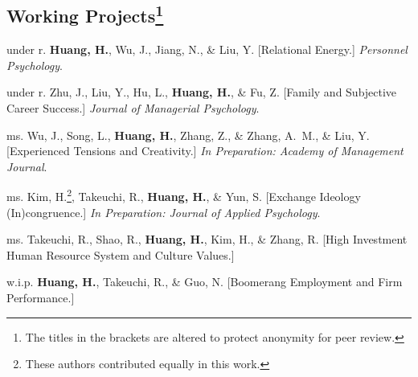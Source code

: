 \documentclass[12pt,letterpaper]{report} %
\begin{document}
    
    \subsection*{Working Projects\footnote{The titles in the brackets are altered to protect anonymity for peer review.}}
    \begin{tablist}

        \item[under r.]\tab{}\textbf{Huang, H.}, Wu, J., Jiang, N., \& Liu, Y. [Relational Energy.] \textit{Personnel Psychology}.
        
        \item[under r.]\tab{}Zhu, J., Liu, Y., Hu, L., \textbf{Huang, H.}, \& Fu, Z. [Family and Subjective Career Success.] \textit{Journal of Managerial Psychology}.
        
        \item[ms.]\tab{}Wu, J., Song, L., \textbf{Huang, H.},  Zhang, Z., \& Zhang, A.~M., \& Liu, Y. [Experienced Tensions and Creativity.]  \textit{In Preparation: Academy of Management Journal}.
        
        \item[ms.]\tab{}Kim, H.\footnote{\label{fn:eqauth}These authors contributed equally in this work.}, Takeuchi, R., \textbf{Huang, H.}, \& Yun, S. [Exchange Ideology (In)congruence.] \textit{In Preparation: Journal of Applied Psychology}.
        \item[ms.]\tab{}Takeuchi, R., Shao, R., \textbf{Huang, H.}, Kim, H., \& Zhang, R. [High Investment Human Resource System and Culture Values.] %
        
        \item[w.i.p.]\tab{}\textbf{Huang, H.}, Takeuchi, R., \& Guo, N. [Boomerang Employment and Firm Performance.] %
    \end{tablist}



\end{document}
